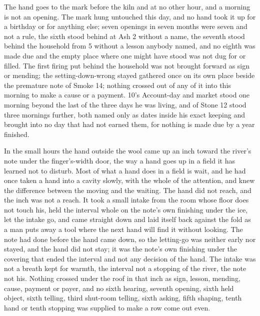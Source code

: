 The hand goes to the mark before the kiln and at no other hour, and a morning is not an opening. The mark hung untouched this day, and no hand took it up for a birthday or for anything else; seven openings in seven months were seven and not a rule, the sixth stood behind at Ash 2 without a name, the seventh stood behind the household from  5 without a lesson anybody named, and no eighth was made due and the empty place where one might have stood was not dug for or filled. The first firing put behind the household was not brought forward as sign or mending; the setting-down-wrong stayed gathered once on its own place beside the premature note of Smoke 14; nothing crossed out of any of it into this morning to make a cause or a payment.  10's Account-day and market stood one morning beyond the last of the three days he was living, and  of Stone 12 stood three mornings further, both named only as dates inside his exact keeping and brought into no day that had not earned them, for nothing is made due by a year finished.

In the small hours the hand outside the wool came up an inch toward the river's note under the finger's-width door, the way a hand goes up in a field it has learned not to disturb. Most of what a hand does in a field is wait, and he had once taken a hand into a cavity slowly, with the whole of the attention, and knew the difference between the moving and the waiting. The hand did not reach, and the inch was not a reach. It took a small intake from the room whose floor does not touch his, held the interval whole on the note's own finishing under the ice, let the intake go, and came straight down and laid itself back against the fold as a man puts away a tool where the next hand will find it without looking. The note had done before the hand came down, so the letting-go was neither early nor stayed, and the hand did not stay; it was the note's own finishing under the covering that ended the interval and not any decision of the hand. The intake was not a breath kept for warmth, the interval not a stopping of the river, the note not his. Nothing crossed under the roof in that inch as sign, lesson, mending, cause, payment or payer, and no sixth hearing, seventh opening, sixth held object, sixth telling, third shut-room telling, sixth asking, fifth shaping, tenth hand or tenth stopping was supplied to make a row come out even.

